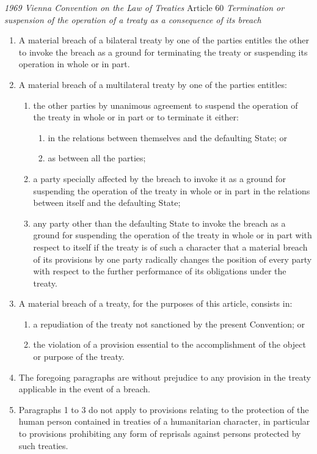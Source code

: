 \begin{conventiondetails}{\textit{1969 Vienna Convention on the Law of Treaties} Article 60}
    \flushleft
    \textit{Termination or suspension of the operation of a treaty as a consequence of its breach}

    \begin{enumerate}
        \item A material breach of a bilateral treaty by one of the parties entitles the other to invoke the breach as a ground for terminating the treaty or suspending its operation in whole or in part. 
        \item A material breach of a multilateral treaty by one of the parties entitles:
        \begin{enumerate}[label=(\alph*)]
            \item the other parties by unanimous agreement to suspend the operation of the treaty in whole or in part or to terminate it either:
            \begin{enumerate}[label=(\roman*)]
                \item in the relations between themselves and the defaulting State; or 
                \item as between all the parties;
            \end{enumerate}
            \item a party specially affected by the breach to invoke it as a ground for suspending the operation of the treaty in whole or in part in the relations between itself and the defaulting State; 
            \item any party other than the defaulting State to invoke the breach as a ground for suspending the operation of the treaty in whole or in part with respect to itself if the treaty is of such a character that a material breach of its provisions by one party radically changes the position of every party with respect to the further performance of its obligations under the treaty.
        \end{enumerate}
        \item A material breach of a treaty, for the purposes of this article, consists in:
        \begin{enumerate}[label=(\alph*)]
            \item a repudiation of the treaty not sanctioned by the present Convention; or 
            \item the violation of a provision essential to the accomplishment of the object or purpose of the treaty.
        \end{enumerate}
        \item The foregoing paragraphs are without prejudice to any provision in the treaty applicable in the event of a breach. 
        \item Paragraphs 1 to 3 do not apply to provisions relating to the protection of the human person contained in treaties of a humanitarian character, in particular to provisions prohibiting any form of reprisals against persons protected by such treaties. 
    \end{enumerate}
\end{conventiondetails}

